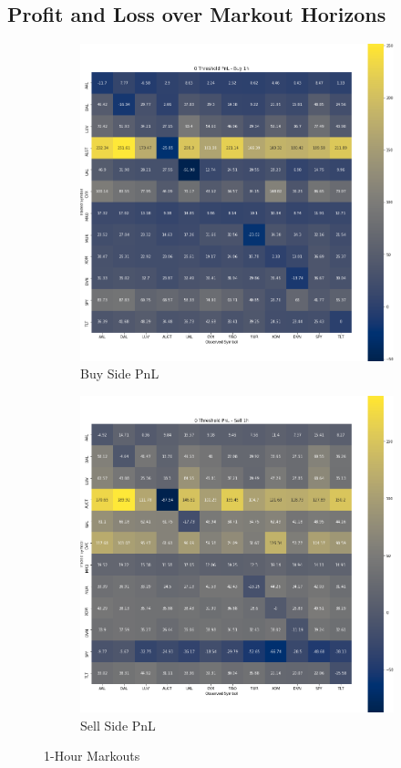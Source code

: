 \documentclass{article}
\begin{document}
\subsection{Profit and Loss over Markout Horizons}
\begin{figure}[h!]
  \centering
  \begin{subfigure}{.5\textwidth}
    \centering
    \includegraphics[width=.95\linewidth]{../Figures/pair_buy_pnl_1h.png}
    \caption{Buy Side PnL}
  \end{subfigure}%
  \begin{subfigure}{.5\textwidth}
    \centering
    \includegraphics[width=.95\linewidth]{../Figures/pair_sell_pnl_1h.png}
    \caption{Sell Side PnL}
  \end{subfigure}
  \caption{1-Hour Markouts}
\end{figure}
\end{document}
